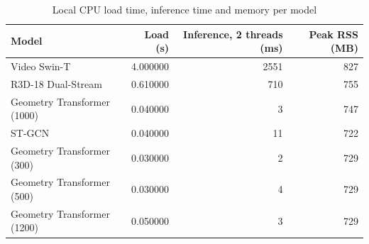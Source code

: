 \begin{table}[htbp]
\caption{Local CPU load time, inference time and memory per model}
\label{tab:table06_local_latency_memory}
\begin{tabular}{lrrr}
\toprule
Model & Load (s) & Inference, 2 threads (ms) & Peak RSS (MB) \\
\midrule
Video Swin-T & 4.000000 & 2551 & 827 \\
R3D-18 Dual-Stream & 0.610000 & 710 & 755 \\
Geometry Transformer (1000) & 0.040000 & 3 & 747 \\
ST-GCN & 0.040000 & 11 & 722 \\
Geometry Transformer (300) & 0.030000 & 2 & 729 \\
Geometry Transformer (500) & 0.030000 & 4 & 729 \\
Geometry Transformer (1200) & 0.050000 & 3 & 729 \\
\bottomrule
\end{tabular}
\end{table}
